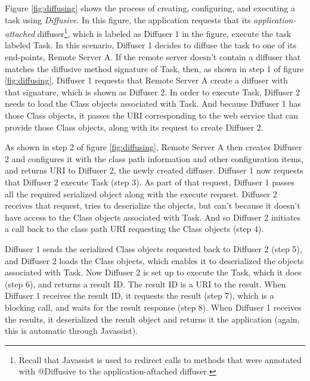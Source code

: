 \documentclass[11pt]{scrartcl}
\begin{document}
Figure \ref{fig:diffusing} shows the process of creating, configuring, and executing a task using \emph{Diffusive}. In this figure, the application requests that its \emph{application-attached} diffuser\footnote{Recall that Javassist is used to redirect calls to methods that were annotated with \textsf{@Diffusive} to the application-aftached diffuser.}, which is labeled as \textsf{Diffuser 1} in the figure, execute the task labeled \textsf{Task}. In this scenario, \textsf{Diffuser 1} decides to diffuse the task to one of its end-points, \textsf{Remote Server A}. If the remote server doesn't contain a diffuser that matches the diffusive method signature of \textsf{Task}, then, as shown in step 1 of figure \ref{fig:diffusing}, \textsf{Diffuser 1} requests that \textsf{Remote Server A} create a diffuser with that signature, which is shown as \textsf{Diffuser 2}. In order to execute \textsf{Task}, \textsf{Diffuser 2} needs to load the \textsf{Class} objects associated with \textsf{Task}. And because \textsf{Diffuser 1} has those \textsf{Class} objects, it passes the URI corresponding to the web service that can provide those \textsf{Class} objects, along with its request to create \textsf{Diffuser 2}.

As shown in step 2 of figure \ref{fig:diffusing}, \textsf{Remote Server A} then creates \textsf{Diffuser 2} and configures it with the class path information and other configuration items, and returns URI to \textsf{Diffuser 2}, the newly created diffuser. \textsf{Diffuser 1} now requests that \textsf{Diffuser 2} execute \textsf{Task} (step 3). As part of that request, \textsf{Diffuser 1} passes all the required serialized object along with the execute request. \textsf{Diffuser 2} receives that request, tries to deserialize the objects, but can't because it doesn't have access to the \textsf{Class} objects associated with \textsf{Task}. And so \textsf{Diffuser 2} initiates a call back to the class path URI requesting the \textsf{Class} objects (step 4).

\textsf{Diffuser 1} sends the serialized \textsf{Class} objects requested back to \textsf{Diffuser 2} (step 5), and \textsf{Diffuser 2} loads the \textsf{Class} objects, which enables it to deserialized the objects associated with \textsf{Task}. Now \textsf{Diffuser 2} is set up to execute the \textsf{Task}, which it does (step 6), and returns a result ID. The result ID is a URI to the result. When \textsf{Diffuser 1} receives the result ID, it requests the result (step 7), which is a blocking call, and waits for the result response (step 8). When \textsf{Diffuser 1} receives the results, it deserialized the result object and returns it the application (again, this is automatic through Javassist).
\end{document}

